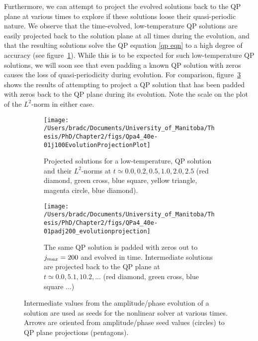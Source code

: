 \documentclass[../PhD.tex]{subfiles}
\begin{document}
Furthermore, we can attempt to project the evolved solutions back to the QP plane at various times to explore if these solutions loose their quasi-periodic nature. We observe that the time-evolved, low-temperature QP solutions are easily projected back to the solution plane at all times during the evolution, and that the resulting solutions solve the QP equation \eqref{qp eqn} to a high degree of accuracy (see figure~\ref{fig: Qpa4_40e-01j100EvolutionProjection}). While this is to be expected for such low-temperature QP solutions, we will soon see that even padding a known QP solution with zeros causes the loss of quasi-periodicity during evolution. For comparison, figure~\ref{fig: QPa4_40e-01padj200_evolutionprojection} shows the results of attempting to project a QP solution that has been padded with zeros back to the QP plane during its evolution. Note the scale on the plot of the $L^2$-norm in either case.

\begin{figure}[h]
	\centering
	\begin{subfigure}[t]{0.45\textwidth}
		\texttt{[image: /Users/bradc/Documents/University\_of\_Manitoba/Thesis/PhD/Chapter2/figs/Qpa4\_40e-01j100EvolutionProjectionPlot]}
		\caption{Projected solutions for a low-temperature, QP solution and their $L^2$-norms at $t\simeq 0.0, 0.2, 0.5, 1.0, 2.0, 2.5$ (red diamond, green cross, blue square, yellow triangle, magenta circle, blue diamond).}
		\label{fig: Qpa4_40e-01j100EvolutionProjection}
	\end{subfigure}
	\;
	\begin{subfigure}[t]{0.45\textwidth}
		\texttt{[image: /Users/bradc/Documents/University\_of\_Manitoba/Thesis/PhD/Chapter2/figs/QPa4\_40e-01padj200\_evolutionprojection]}
		\caption{The same QP solution is padded with zeros out to $j_{max} = 200$ and evolved in time. Intermediate solutions are projected back to the QP plane at $t \simeq 0.0, 5.1, 10.2, ...$ (red diamond, green cross, blue square ...)}
		\label{fig: QPa4_40e-01padj200_evolutionprojection}
	\end{subfigure}
	\caption[Taking the spectrum of a QP solution during evolution to use as a seed to find new QP solutions]{Intermediate values from the amplitude/phase evolution of a solution are used as seeds for the nonlinear solver at various times. Arrows are oriented from amplitude/phase seed values (circles) to QP plane projections (pentagons).}
\end{figure}

\end{document}
